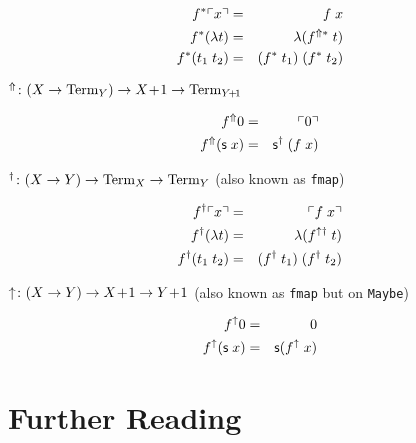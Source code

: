 \begin{eqnarray*}
  f^*\ulcorner x \urcorner   & = & f\;x \\
  f^*(\lambda t) & = & \lambda (f^{\Uparrow*} \; t) \\
  f^*(t_1\;t_2)  & = & (f^* \; t_1) \; (f^* \; t_2)
\end{eqnarray*}

$^\Uparrow \colon (X \to \mathrm{Term}_{Y}) \to X\!+\!1 \to \mathrm{Term}_{Y\!+\!1}$

\begin{eqnarray*}
  f^\Uparrow 0 & = & \ulcorner 0 \urcorner \\
  f^\Uparrow (\mathsf{s} \; x) & = & \mathsf{s}^\dagger\;(f\;x) \\
\end{eqnarray*}

$^\dagger \colon (X \to Y) \to \mathrm{Term}_{X} \to \mathrm{Term}_{Y}$ (also known as \texttt{fmap})

\begin{eqnarray*}
  f^\dagger\ulcorner x \urcorner   & = & \ulcorner f\;x \urcorner \\
  f^\dagger(\lambda t) & = & \lambda(f^{\uparrow\dagger}\;t) \\
  f^\dagger(t_1\;t_2)  & = & (f^\dagger\;t_1)\;(f^\dagger\;t_2)
\end{eqnarray*}

$\uparrow \colon (X \to Y) \to X\!+\!1 \to Y\!+\!1$
  (also known as \texttt{fmap} but on \texttt{Maybe})

\begin{eqnarray*}
  f^\uparrow 0            & = & 0 \\
  f^\uparrow (\mathsf{s}\;x) & = & \mathsf{s}(f^\uparrow \; x)
\end{eqnarray*}

\section{Further Reading}
